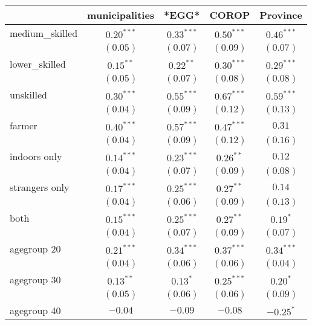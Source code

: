 
\begin{table}
\begin{center}
\begin{tabular}{l c c c c}
\hline
 & municipalities & *EGG* & COROP & Province \\
\hline
medium\_skilled & $0.20^{***}$  & $0.33^{***}$  & $0.50^{***}$  & $0.46^{***}$  \\
                & $(0.05)$      & $(0.07)$      & $(0.09)$      & $(0.07)$      \\
lower\_skilled  & $0.15^{**}$   & $0.22^{**}$   & $0.30^{***}$  & $0.29^{***}$  \\
                & $(0.05)$      & $(0.07)$      & $(0.08)$      & $(0.08)$      \\
unskilled       & $0.30^{***}$  & $0.55^{***}$  & $0.67^{***}$  & $0.59^{***}$  \\
                & $(0.04)$      & $(0.09)$      & $(0.12)$      & $(0.13)$      \\
farmer          & $0.40^{***}$  & $0.57^{***}$  & $0.47^{***}$  & $0.31$        \\
                & $(0.04)$      & $(0.09)$      & $(0.12)$      & $(0.16)$      \\
indoors only    & $0.14^{***}$  & $0.23^{***}$  & $0.26^{**}$   & $0.12$        \\
                & $(0.04)$      & $(0.07)$      & $(0.09)$      & $(0.08)$      \\
strangers only  & $0.17^{***}$  & $0.25^{***}$  & $0.27^{**}$   & $0.14$        \\
                & $(0.04)$      & $(0.06)$      & $(0.09)$      & $(0.13)$      \\
both            & $0.15^{***}$  & $0.25^{***}$  & $0.27^{**}$   & $0.19^{*}$    \\
                & $(0.04)$      & $(0.07)$      & $(0.09)$      & $(0.07)$      \\
agegroup 20     & $0.21^{***}$  & $0.34^{***}$  & $0.37^{***}$  & $0.34^{***}$  \\
                & $(0.04)$      & $(0.06)$      & $(0.06)$      & $(0.04)$      \\
agegroup 30     & $0.13^{**}$   & $0.13^{*}$    & $0.25^{***}$  & $0.20^{*}$    \\
                & $(0.05)$      & $(0.06)$      & $(0.06)$      & $(0.09)$      \\
agegroup 40     & $-0.04$       & $-0.09$       & $-0.08$       & $-0.25^{*}$   \\

\end{tabular}
\end{center}
\end{table}
